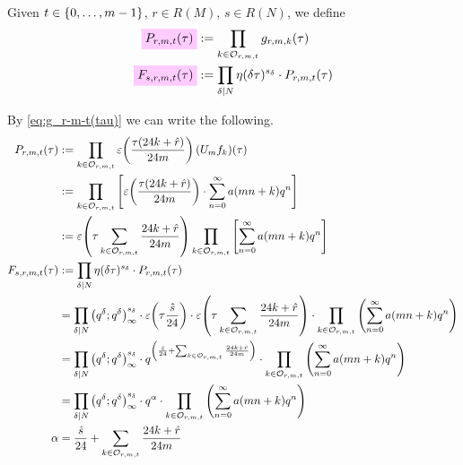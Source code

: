 \documentclass{article}
\begin{document}
\begin{Definition}\cite[Def.~44]{Radu:RamanujanKolberg:2015}
  Given $t\in\left\{0,\ldots,m-1\right\}$, $r \in R(M)$, $s \in R(N)$, we
  define
  \begin{align}
    \defineNotation[P-r-m-t-tau]{P_{r, m, t}(\tau)}
    &:= \prod_{k \in \modularOrbit{r,m,t}} g_{r,m,k}(\tau)\\
    \defineNotation[F-s-r-m-t-tau]{F_{s, r, m, t}(\tau)}
    &:= \divisorprod{N} \eta(\delta\tau)^{s_\delta} \cdot P_{r, m, t}(\tau)
  \end{align}
\end{Definition}

By \eqref{eq:g_r-m-t(tau)} we can write the following.
\begin{align}
  P_{r, m, t}(\tau)
  &:= \prod_{k \in \mathcal{O}_{r,m,t}}
    \varepsilon\!\left(\frac{\tau (24k+\hat{r})}{24m}\right) (U_mf_{k})(\tau)\\
  &:= \prod_{k \in \mathcal{O}_{r,m,t}}
    \left[\varepsilon\!\left(\frac{\tau (24k+\hat{r})}{24m}\right)
    \cdot \sum_{n=0}^\infty a(mn+k) q^n\right]
  \\
  &:=
    \varepsilon\!\left(\tau\sum_{k\in\mathcal{O}_{r,m,t}}\frac{24k+\hat{r}}{24m}\right)
    \prod_{k \in \mathcal{O}_{r,m,t}} \left[\sum_{n=0}^\infty a(mn+k) q^n\right]
  \\
  F_{s, r, m, t}(\tau)
  &:= \prod_{\delta \mid N} \eta(\delta\tau)^{s_\delta} \cdot P_{r,m,t}(\tau)
  \\
  &= \prod_{\delta \mid N} \left( q^{\delta};q^{\delta} \right)_{\infty}^{s_\delta}
    \cdot
    \varepsilon\!\left(\tau\frac{\hat{s}}{24}\right)
    \cdot
    \varepsilon\!\left(\tau\sum_{k\in\mathcal{O}_{r,m,t}}\frac{24k+\hat{r}}{24m}\right)
    \cdot
    \prod_{k \in \mathcal{O}_{r,m,t}} \left(\sum_{n=0}^\infty a(mn+k) q^n\right)
    \label{eq:F_s-r-m-t(tau)}
  \\
  &= \prod_{\delta \mid N} \left( q^{\delta};q^{\delta} \right)_{\infty}^{s_\delta}
    \cdot
    q^{
    \left(
    \frac{\hat{s}}{24}
    +
    \sum_{k\in\mathcal{O}_{r,m,t}}\frac{24k+\hat{r}}{24m}
    \right)
    }
    \cdot
    \prod_{k \in \mathcal{O}_{r,m,t}} \left(\sum_{n=0}^\infty a(mn+k) q^n\right)
  \\
  &= \prod_{\delta \mid N} \left( q^{\delta};q^{\delta} \right)_{\infty}^{s_\delta}
    \cdot
    q^\alpha
    \cdot
    \prod_{k \in \mathcal{O}_{r,m,t}} \left(\sum_{n=0}^\infty a(mn+k) q^n\right)
  \\
  \alpha
  &=
    \frac{\hat{s}}{24}
    +
    \sum_{k\in\mathcal{O}_{r,m,t}}\frac{24k+\hat{r}}{24m}
    \label{eq:alphaInfinity}
\end{align}
\end{document}
